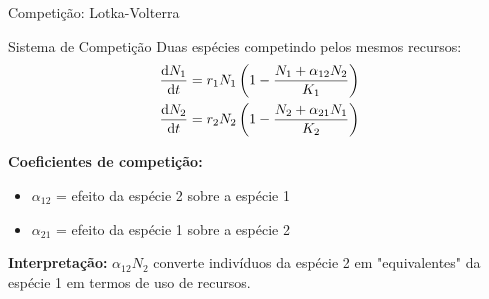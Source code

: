 \begin{frame}{Competição: Lotka-Volterra}
\begin{block}{Sistema de Competição}
Duas espécies competindo pelos mesmos recursos:
\begin{align*}
\frac{\mathrm{d} N_1}{\mathrm{d} t} &= r_1 N_1\left(1 - \frac{N_1 + \alpha_{12}N_2}{K_1}\right)\\
\frac{\mathrm{d} N_2}{\mathrm{d} t} &= r_2 N_2\left(1 - \frac{N_2 + \alpha_{21}N_1}{K_2}\right)
\end{align*}

\textbf{Coeficientes de competição:}
\begin{itemize}
    \item $\alpha_{12}$ = efeito da espécie 2 sobre a espécie 1
    \item $\alpha_{21}$ = efeito da espécie 1 sobre a espécie 2
\end{itemize}
\end{block}

\textbf{Interpretação:} $\alpha_{12}N_2$ converte indivíduos da espécie 2 em "equivalentes" da espécie 1 em termos de uso de recursos.
\end{frame}

